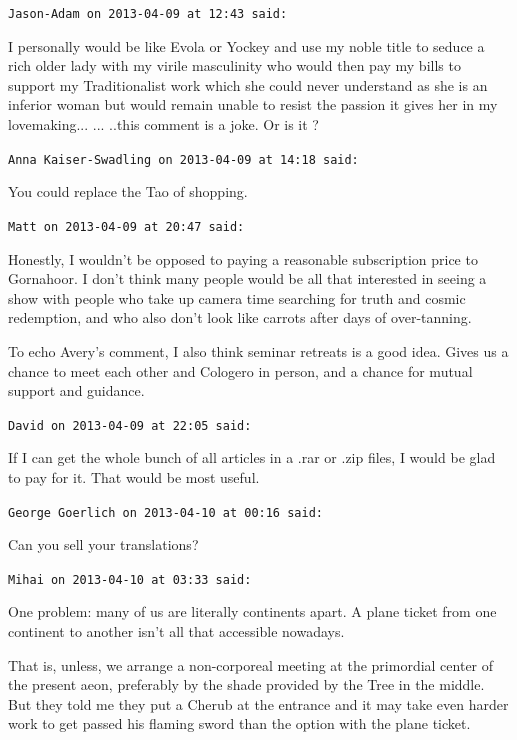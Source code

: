 \begin{footnotesize}
\begin{sffamily}
\hfill

\texttt{Jason-Adam on 2013-04-09 at 12:43 said:}

I personally would be like Evola or Yockey and use my noble title to seduce a rich older lady with my virile masculinity who would then pay my bills to support my Traditionalist work which she could never understand as she is an inferior woman but would remain unable to resist the passion it gives her in my lovemaking... ... ..this comment is a joke. Or is it ?

\hfill

\texttt{Anna Kaiser-Swadling on 2013-04-09 at 14:18 said:}

You could replace the Tao of shopping.

\hfill

\texttt{Matt on 2013-04-09 at 20:47 said:}

Honestly, I wouldn't be opposed to paying a reasonable subscription price to Gornahoor. I don't think many people would be all that interested in seeing a show with people who take up camera time searching for truth and cosmic redemption, and who also don't look like carrots after days of over-tanning.

To echo Avery's comment, I also think seminar retreats is a good idea. Gives us a chance to meet each other and Cologero in person, and a chance for mutual support and guidance.

\hfill

\texttt{David on 2013-04-09 at 22:05 said:}

If I can get the whole bunch of all articles in a .rar or .zip files, I would be glad to pay for it. That would be most useful.

\hfill

\texttt{George Goerlich on 2013-04-10 at 00:16 said:}

Can you sell your translations?

\hfill

\texttt{Mihai on 2013-04-10 at 03:33 said:}

One problem: many of us are literally continents apart. A plane ticket from one continent to another isn't all that accessible nowadays.

That is, unless, we arrange a non-corporeal meeting at the primordial center of the present aeon, preferably by the shade provided by the Tree in the middle. But they told me they put a Cherub at the entrance and it may take even harder work to get passed his flaming sword than the option with the plane ticket.


\end{sffamily}
\end{footnotesize}
